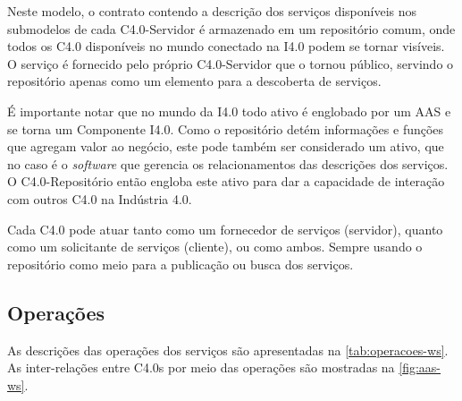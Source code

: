 Neste modelo, o contrato contendo a descrição dos serviços disponíveis nos submodelos de cada C4.0-Servidor é armazenado em um repositório comum, onde todos os C4.0 disponíveis no mundo conectado na I4.0 podem se tornar visíveis. O serviço é fornecido pelo próprio C4.0-Servidor que o tornou público, servindo o repositório apenas como um elemento para a descoberta de serviços.

É importante notar que no mundo da I4.0 todo ativo é englobado por um AAS e se torna um Componente I4.0. Como o repositório detém informações e funções que agregam valor ao negócio, este pode também ser considerado um ativo, que no caso é o \textit{software} que gerencia os relacionamentos das descrições dos serviços. O C4.0-Repositório então engloba este ativo para dar a capacidade de interação com outros C4.0 na Indústria 4.0.

Cada C4.0 pode atuar tanto como um fornecedor de serviços (servidor), quanto como um solicitante de serviços (cliente), ou como ambos. Sempre usando o repositório como meio para a publicação ou busca dos serviços.

\subsection{Operações}

As descrições das operações dos serviços são apresentadas na \autoref{tab:operacoes-ws}. As inter-relações entre C4.0s por meio das operações são mostradas na \autoref{fig:aas-ws}.

